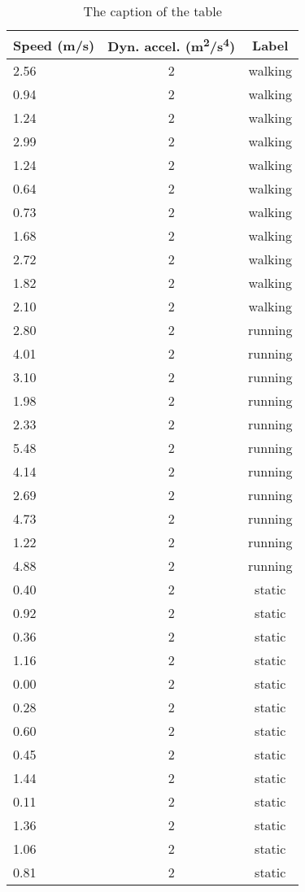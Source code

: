 \begin{table}
\begin{tabular}{lcc}
\hline\noalign{\smallskip}
\textbf{Speed (m/s)} & \textbf{Dyn. accel. (m\textsuperscript{2}/s\textsuperscript{4})} & \textbf{Label}\\
\hline\noalign{\smallskip}
2.56 & 2 & walking\\
0.94 & 2 & walking\\
1.24 & 2 & walking\\
2.99 & 2 & walking\\
1.24 & 2 & walking\\
0.64 & 2 & walking\\
0.73 & 2 & walking\\
1.68 & 2 & walking\\
2.72 & 2 & walking\\
1.82 & 2 & walking\\
2.10 & 2 & walking\\
2.80 & 2 & running\\
4.01 & 2 & running\\
3.10 & 2 & running\\
1.98 & 2 & running\\
2.33 & 2 & running\\
5.48 & 2 & running\\
4.14 & 2 & running\\
2.69 & 2 & running\\
4.73 & 2 & running\\
1.22 & 2 & running\\
4.88 & 2 & running\\
0.40 & 2 & static\\
0.92 & 2 & static\\
0.36 & 2 & static\\
1.16 & 2 & static\\
0.00 & 2 & static\\
0.28 & 2 & static\\
0.60 & 2 & static\\
0.45 & 2 & static\\
1.44 & 2 & static\\
0.11 & 2 & static\\
1.36 & 2 & static\\
1.06 & 2 & static\\
0.81 & 2 & static\\

\end{tabular}
\caption{The caption of the table}\label{table:data-from-phone}
\end{table}






